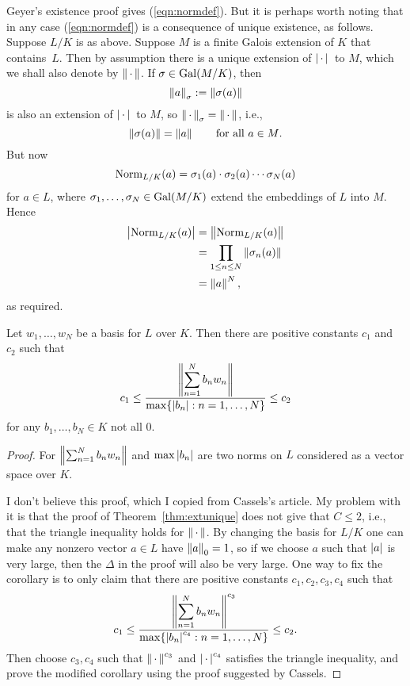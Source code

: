 \begin{remark}
  Geyer's existence proof gives (\ref{eqn:normdef}).  But it is
  perhaps worth noting that in any case (\ref{eqn:normdef}) is a
  consequence of unique existence, as follows.  Suppose $L/K$ is as
  above.  Suppose $M$ is a finite Galois extension of $K$ that
  contains~$L$.  Then by assumption there is a unique extension of
  $\left|\,\cdot\,\right|{}$ to $M$, which we shall also denote by $\left\|\,\cdot\,\right\|$.  If
  $\sigma\in\operatorname{Gal}(M/K)$, then
$$\left\|a\right\|_\sigma := \left\|\sigma(a)\right\|
$$
is also an extension of $\left|\,\cdot\,\right|{}$ to $M$, so $\left\|\,\cdot\,\right\|_\sigma = \left\|\,\cdot\,\right\|$,
i.e.,
$$ 
  \left\|\sigma(a)\right\| = \left\|a\right\|\qquad\text{for all $a\in M$}.
$$
But now 
$$
\operatorname{Norm}_{L/K}(a) = \sigma_1(a) \cdot \sigma_2(a) \cdots \sigma_N(a)
$$
for $a\in L$, where $\sigma_1,\ldots, \sigma_N\in \operatorname{Gal}(M/K)$ extend the embeddings
of $L$ into $M$.
Hence 
\begin{align*}
 \left|\operatorname{Norm}_{L/K}(a)\right| &= \left\|\operatorname{Norm}_{L/K}(a)\right\| \\
     &= \prod_{1\leq n \leq N} \left\|\sigma_n(a)\right\|\\
     &= \left\|a\right\|^N,
\end{align*}
as required.
\end{remark}

\begin{corollary} 
Let $w_1,\ldots, w_N$ be a basis for $L$ over $K$.  Then
there are positive constants $c_1$ and $c_2$ such that 
$$
   c_1 \leq \frac{\left\|\displaystyle\sum_{n=1}^{N} b_n w_n\right\|}{\max \{ \left|b_n\right| : n = 1,\ldots, N\}} \leq c_2
$$
for any $b_1,\ldots, b_N\in K$ not all $0$.
\end{corollary}
\begin{proof}
  For $\left\|\sum_{n=1}^N b_n w_n\right\|$ and $\max{\left|b_n\right|}$ are two norms
  on $L$ considered as a vector space over $K$.  

I don't believe this
  proof, which I copied from Cassels's article.  My problem with it is
  that the proof of Theorem~\ref{thm:extunique} does not give that
  $C\leq 2$, i.e., that the triangle inequality holds for $\left\|\,\cdot\,\right\|$.  By
changing the basis for $L/K$ one can make any nonzero vector $a\in L$
have $\left\|a\right\|_0=1$, so if we choose $a$ such that $\left|a\right|$ is very large,
then the $\Delta$ in the proof will also be very large.  One way to fix
the corollary is to only claim that there are positive
constants $c_1, c_2,c_3, c_4$
such that 
$$
   c_1 \leq \frac{\left\|\displaystyle\sum_{n=1}^{N} b_n w_n\right\|^{c_3}}{\max \{ \left|b_n\right|^{c_4} : n = 1,\ldots, N\}} \leq c_2.
$$
Then choose $c_3, c_4$ such that $\left\|\,\cdot\,\right\|^{c_3}$ and $\left|\,\cdot\,\right|^{c_4}$ satisfies the triangle inequality, and prove the modified corollary
using the proof suggested by Cassels.
\end{proof}

